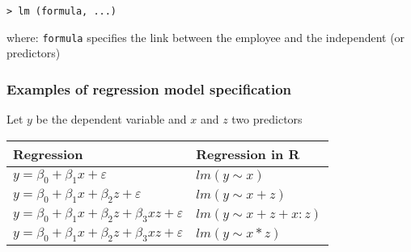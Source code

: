 \documentclass[
]{article}
\begin{document}
\texttt{\textgreater{}\ lm\ (formula,\ ...)}

where: \texttt{formula} specifies the link between the employee and the
independent (or predictors)

\hypertarget{examples-of-regression-model-specification}{%
\subsubsection{Examples of regression model
specification}\label{examples-of-regression-model-specification}}

Let \(y\) be the dependent variable and \(x\) and \(z\) two predictors

\begin{longtable}[]{@{}ll@{}}
\toprule
\begin{minipage}[b]{0.41\columnwidth}\raggedright
\textbf{Regression}\strut
\end{minipage} & \begin{minipage}[b]{0.53\columnwidth}\raggedright
\textbf{Regression in R}\strut
\end{minipage}\tabularnewline
\midrule
\endhead
\begin{minipage}[t]{0.41\columnwidth}\raggedright
\(y = \beta_{0} + \beta_{1} x + \varepsilon\)\strut
\end{minipage} & \begin{minipage}[t]{0.53\columnwidth}\raggedright
\(lm (y \sim x)\)\strut
\end{minipage}\tabularnewline
\begin{minipage}[t]{0.41\columnwidth}\raggedright
\(y = \beta_{0} + \beta_{1} x + \beta_{2} z + \varepsilon\)\strut
\end{minipage} & \begin{minipage}[t]{0.53\columnwidth}\raggedright
\(lm (y \sim x + z)\)\strut
\end{minipage}\tabularnewline
\begin{minipage}[t]{0.41\columnwidth}\raggedright
\(y = \beta_{0} + \beta_{1} x + \beta_{2} z + \beta_{3} xz + \varepsilon\)\strut
\end{minipage} & \begin{minipage}[t]{0.53\columnwidth}\raggedright
\(lm (y \sim x + z + x: z)\)\strut
\end{minipage}\tabularnewline
\begin{minipage}[t]{0.41\columnwidth}\raggedright
\(y = \beta_{0} + \beta_{1} x + \beta_{2} z + \beta_{3} xz + \varepsilon\)\strut
\end{minipage} & \begin{minipage}[t]{0.53\columnwidth}\raggedright
\(lm (y \sim x * z)\)\strut
\end{minipage}\tabularnewline
\bottomrule
\end{longtable}
\end{document}
